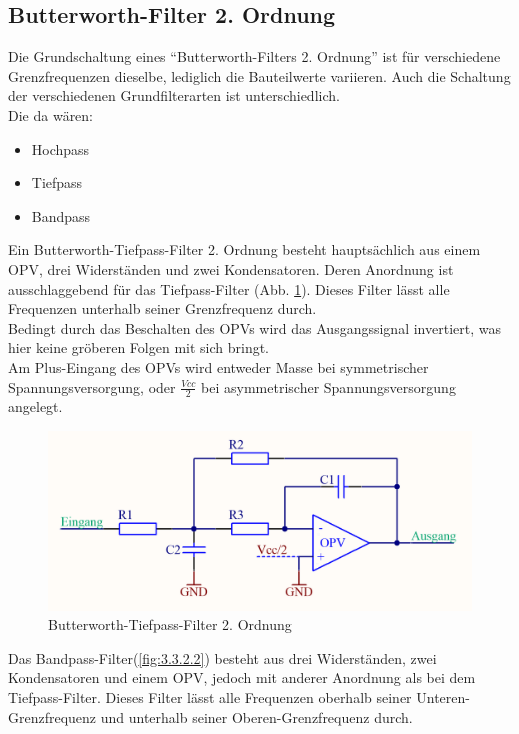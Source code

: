 \subsection{Butterworth-Filter 2. Ordnung}\label{subsec:3.3.1}
Die Grundschaltung eines \enquote{Butterworth-Filters 2. Ordnung} ist für verschiedene Grenzfrequenzen dieselbe, lediglich die Bauteilwerte variieren.
Auch die Schaltung der verschiedenen Grundfilterarten ist unterschiedlich. \\
Die da wären: 
\begin{itemize}
	\item Hochpass
	\item Tiefpass
	\item Bandpass
\end{itemize}
Ein Butterworth-Tiefpass-Filter 2. Ordnung besteht hauptsächlich aus einem OPV, drei Widerständen und zwei Kondensatoren.
Deren Anordnung ist ausschlaggebend für das Tiefpass-Filter (Abb. \ref{fig:3.3.2.1}).
Dieses Filter lässt alle Frequenzen unterhalb seiner Grenzfrequenz durch.\\ 
Bedingt durch das Beschalten des OPVs wird das Ausgangssignal invertiert, was hier keine gröberen Folgen mit sich bringt.\\ 
Am Plus-Eingang des OPVs wird entweder Masse bei symmetrischer Spannungsversorgung, oder $\frac{Vcc}{2}$ bei asymmetrischer Spannungsversorgung angelegt.
\begin{figure} [H]
	\centering
	\includegraphics[width=1\textwidth]{img/Print3/TPFilterButterworth2Ordnung.PNG}
	\caption{Butterworth-Tiefpass-Filter 2. Ordnung}
	\label {fig:3.3.2.1}
\end{figure}
Das Bandpass-Filter(\ref{fig:3.3.2.2}) besteht aus drei Widerständen, zwei Kondensatoren und einem OPV, jedoch mit anderer Anordnung als bei dem Tiefpass-Filter.
Dieses Filter lässt alle Frequenzen oberhalb seiner Unteren-Grenzfrequenz und unterhalb seiner Oberen-Grenzfrequenz durch.
